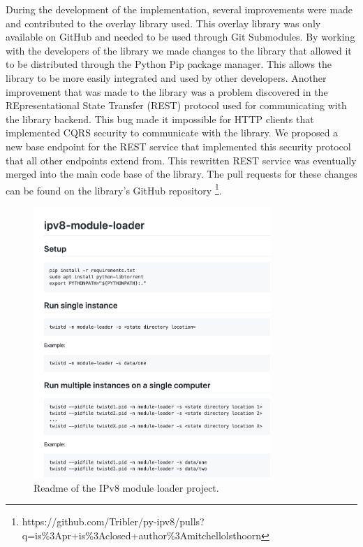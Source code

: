 During the development of the implementation, several improvements were made and contributed to the overlay library used. This overlay library was only available on GitHub and needed to be used through Git Submodules. By working with the developers of the library we made changes to the library that allowed it to be distributed through the Python Pip package manager. This allows the library to be more easily integrated and used by other developers. Another improvement that was made to the library was a problem discovered in the REpresentational State Transfer (REST) protocol used for communicating with the library backend. This bug made it impossible for HTTP clients that implemented CQRS security to communicate with the library. We proposed a new base endpoint for the REST service that implemented this security protocol that all other endpoints extend from. This rewritten REST service was eventually merged into the main code base of the library. The pull requests for these changes can be found on the library's GitHub repository \footnote{https://github.com/Tribler/py-ipv8/pulls?q=is\%3Apr+is\%3Aclosed+author\%3Amitchellolsthoorn}.

\begin{figure}[h!]
	\centering
	\includegraphics[width=0.8\textwidth]{images/implementation-readme.png}
	\caption{\label{fig:project-readme} Readme of the IPv8 module loader project.}
\end{figure}


